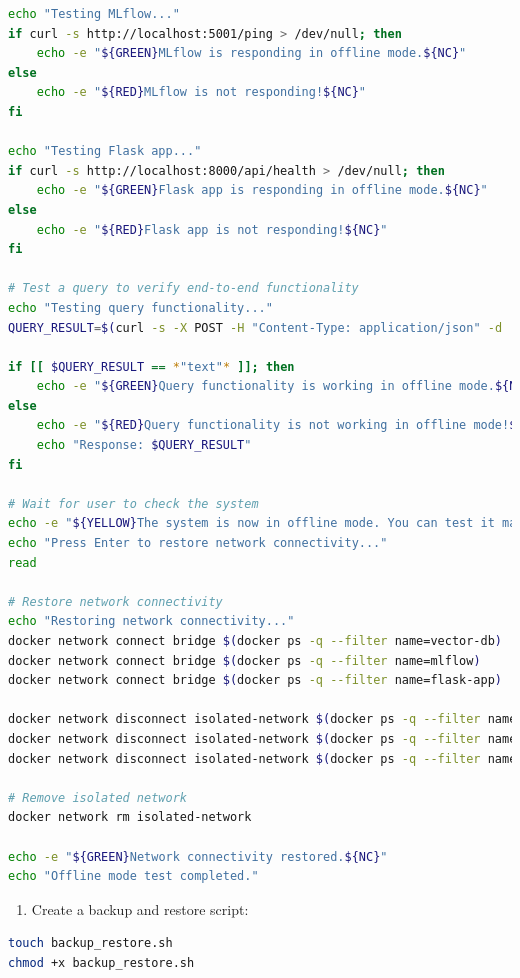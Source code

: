 \documentclass[
  screen,review,acmlarge]{acmart}
\providecommand{\tightlist}{%
  \setlength{\itemsep}{0pt}\setlength{\parskip}{0pt}}
\begin{document}
\begin{lstlisting}[language=bash]
echo "Testing MLflow..."
if curl -s http://localhost:5001/ping > /dev/null; then
    echo -e "${GREEN}MLflow is responding in offline mode.${NC}"
else
    echo -e "${RED}MLflow is not responding!${NC}"
fi

echo "Testing Flask app..."
if curl -s http://localhost:8000/api/health > /dev/null; then
    echo -e "${GREEN}Flask app is responding in offline mode.${NC}"
else
    echo -e "${RED}Flask app is not responding!${NC}"
fi

# Test a query to verify end-to-end functionality
echo "Testing query functionality..."
QUERY_RESULT=$(curl -s -X POST -H "Content-Type: application/json" -d '{"question":"What is machine learning?"}' http://localhost:8000/api/ask)

if [[ $QUERY_RESULT == *"text"* ]]; then
    echo -e "${GREEN}Query functionality is working in offline mode.${NC}"
else
    echo -e "${RED}Query functionality is not working in offline mode!${NC}"
    echo "Response: $QUERY_RESULT"
fi

# Wait for user to check the system
echo -e "${YELLOW}The system is now in offline mode. You can test it manually.${NC}"
echo "Press Enter to restore network connectivity..."
read

# Restore network connectivity
echo "Restoring network connectivity..."
docker network connect bridge $(docker ps -q --filter name=vector-db)
docker network connect bridge $(docker ps -q --filter name=mlflow)
docker network connect bridge $(docker ps -q --filter name=flask-app)

docker network disconnect isolated-network $(docker ps -q --filter name=vector-db)
docker network disconnect isolated-network $(docker ps -q --filter name=mlflow)
docker network disconnect isolated-network $(docker ps -q --filter name=flask-app)

# Remove isolated network
docker network rm isolated-network

echo -e "${GREEN}Network connectivity restored.${NC}"
echo "Offline mode test completed."
\end{lstlisting}

\begin{enumerate}
\def\labelenumi{\arabic{enumi}.}
\setcounter{enumi}{2}
\tightlist
\item
  Create a backup and restore script:
\end{enumerate}

\begin{lstlisting}[language=bash]
touch backup_restore.sh
chmod +x backup_restore.sh
\end{lstlisting}
\end{document}
